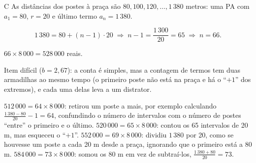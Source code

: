 \begin{resolucao}{C}
 As distâncias dos postes à praça são
$80, 100, 120, \dots, 1\,380$ metros: uma PA com $a_1 = 80$, $r = 20$ e último
termo $a_n = 1\,380$.

\[
1\,380 = 80 + (n - 1)\cdot 20 \;\Rightarrow\; n - 1 = \frac{1\,300}{20} = 65
\;\Rightarrow\; n = 66 .
\]

 $66 \times 8\,000 = 528\,000$ reais.


Item difícil ($b = 2{,}67$): a conta é simples, mas a contagem de termos tem
duas armadilhas ao mesmo tempo (o primeiro poste não está na praça e há o
“$+1$” dos extremos), e cada uma delas leva a um distrator.

\begin{distratores}
 $512\,000 = 64 \times 8\,000$: retirou um poste a mais, por exemplo
calculando $\frac{1\,380 - 80}{20} - 1 = 64$, confundindo o número de intervalos
com o número de postes “entre” o primeiro e o último.
 $520\,000 = 65 \times 8\,000$: contou os 65 intervalos de 20 m, mas
esqueceu o “$+1$”.
 $552\,000 = 69 \times 8\,000$: dividiu $1\,380$ por 20, como se houvesse
um poste a cada 20 m desde a praça, ignorando que o primeiro está a 80 m.
 $584\,000 = 73 \times 8\,000$: somou os 80 m em vez de subtraí-los,
$\frac{1\,380 + 80}{20} = 73$.
\end{distratores}
\end{resolucao}

\secaoineditas

